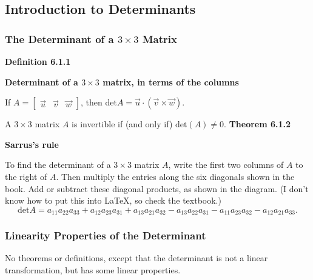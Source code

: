 \subsection{Introduction to Determinants}
\subsubsection*{The Determinant of a $3\times{}3$ Matrix}
\textbf{Definition 6.1.1}\\
\par\noindent\textbf{Determinant of a $3\times{}3$ matrix, in terms of the columns}
\par\noindent If $\displaystyle A=\left[\begin{array}{ccc}\vec{u}&\vec{v}&\vec{w}\end{array}\right]$, then $\textrm{det}A=\vec{u}\cdot{}(\vec{v}\times{}\vec{w})$.
\par\noindent A $3\times{}3$ matrix $A$ is invertible if (and only if) $\textrm{det}(A)\ne{}0$.
\textbf{Theorem 6.1.2}\\
\par\noindent\textbf{Sarrus's rule}
\par\noindent To find the determinant of a $3\times{}3$ matrix $A$, write the first two columns of $A$ to the right of $A$. Then multiply the entries along the six diagonals shown in the book. Add or subtract these diagonal products, as shown in the diagram. (I don't know how to put this into LaTeX, so check the textbook.)
\[\textrm{det}A=a_{11}a_{22}a_{33}+a_{12}a_{23}a_{31}+a_{13}a_{21}a_{32}-a_{13}a_{22}a_{31}-a_{11}a_{23}a_{32}-a_{12}a_{21}a_{33}.\]
\subsubsection*{Linearity Properties of the Determinant}
No theorems or definitions, except that the determinant is not a linear transformation, but has some linear properties.
